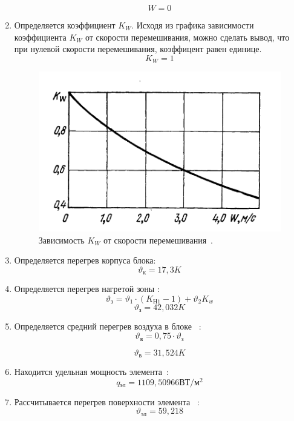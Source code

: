 \begin{enumerate}[label={\arabic*.}]
    $$W = 0$$

  \item Определяется коэффициент $K_W$.
    Исходя из графика зависимости коэффициента $K_W$ от скорости
перемешивания, можно сделать вывод, что при нулевой скорости
перемешивания, коэффицент равен единице.
$$K_W = 1$$
\begin{figure}[h]
  \centering
  \includegraphics[scale=0.5]{images/Rotkop_pic_4.10.png}
  \caption{Зависимость $K_W$ от скорости
перемешивания~\cite{Rotkop1976}. }
\end{figure}

\item Определяется перегрев корпуса блока:
$$\vartheta\mathrm{_к} = 17,3 K$$
\item Определяется перегрев нагретой зоны \cite{Rotkop1976}:
  \begin{equation}
    \vartheta\mathrm{_з} = \vartheta_1 \cdot (K\mathrm{_{Н1}} - 1) + \vartheta_2 K_w
  \end{equation}
$$    \vartheta\mathrm{_з} = 42,032 K$$

\item Определяется средний перегрев воздуха в блоке ~\cite{Rotkop1976}:
  \begin{equation}
    \vartheta\mathrm{_в} = 0,75 \cdot \vartheta\mathrm{_з}
  \end{equation}

  $$\vartheta\mathrm{_в} = 31,524K$$
\item Находится удельная мощность элемента~\cite{Rotkop1976}:
  $$q\mathrm{_{эл}} =1109,50966\mathrm{ВТ/м^2} $$
\item Рассчитывается перегрев поверхности элемента ~\cite{Rotkop1976}:
  $$\vartheta\mathrm{_{эл}} =59,218$$


\end{enumerate}
